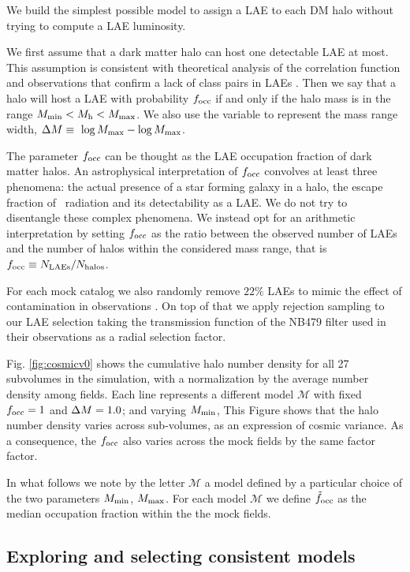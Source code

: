 \documentclass{emulateapj}
\newcommand{\ly}{{\ifmmode{{\rm Ly}\alpha}\else{Ly$\alpha$}\fi}}
\newcommand{\mmin}{{\ifmmode{{M_{\rm min}}}\else{${M_{\rm min}}$}\fi}}
\newcommand{\mmax}{{\ifmmode{{M_{\rm max}}}\else{${M_{\rm max}}$}\fi}}
\newcommand{\dm}{{\ifmmode{{\Delta M}}\else{$\Delta M$}\fi}}
\newcommand{\focc}{{\ifmmode{{f_{\rm occ}}}\else{${f_{\rm occ}}$}\fi}}
\begin{document}
We build the simplest possible model to assign a LAE to each DM halo
without trying to compute a LAE luminosity.
  
We first assume that a dark matter halo can host one detectable LAE at
most.   
This assumption is consistent with theoretical analysis of the
correlation function \citep{Jose2013b} and observations that confirm a
lack of class pairs in LAEs \cite{Bond2009}.  
Then we say that a halo will host a LAE with probability $\focc$
if and only if the halo mass is in the range $\mmin < M_{\mathrm
  h} < \mmax$. 
We also use the variable \dm to represent the mass range width,
$\dm\equiv\ \log \mmax - \log \mmax$. 


The parameter $\focc$ can be thought as the LAE occupation fraction of
dark matter halos.
An astrophysical interpretation of $f_{\rm occ}$ convolves at least
three phenomena: the actual presence of a star forming galaxy in a
halo, the escape fraction of \ly\ radiation and its detectability as
a LAE.   
We do not try to disentangle these complex phenomena.
We instead opt for an arithmetic interpretation by setting $\focc$ as
the ratio between the observed number of LAEs and the number of halos
within the considered mass range, that is $\focc \equiv N_{\rm
  LAEs}/N_{\mathrm{halos}}$.   

For each mock catalog we also randomly remove $22\%$ LAEs to mimic the
effect of contamination in observations \citet{Bielby16}.
On top of that we apply rejection sampling  to our LAE selection
taking the transmission function of the NB479 filter used in their
observations as a radial selection factor. 


Fig. \ref{fig:cosmicv0}  shows the cumulative halo number density
for all 27 subvolumes in the simulation, with a normalization by the
average number density among fields. 
Each line represents a different model $\mathcal{M}$ with fixed
$\focc=1$ and $\dm=1.0$; and varying $\mmin$, 
This Figure shows that the halo number density varies across
sub-volumes, as an expression of cosmic variance. 
As a consequence, the $\focc$ also varies across the mock fields  
by the same factor factor. 



In what follows we note by the letter ${\mathcal M}$ a model
defined by a particular choice of the two parameters $M_{\rm min}$, 
$M_{\rm  max}$. For each model  ${\mathcal M}$ we define
$\tilde{f}_{\rm occ}$ as the median occupation fraction within the the
mock fields.

\subsection{Exploring and selecting consistent models}
\label{subsec:explore}
\end{document}
